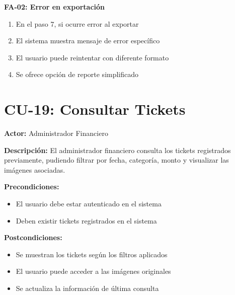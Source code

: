 \textbf{FA-02: Error en exportación}
\begin{enumerate}
    \item En el paso 7, si ocurre error al exportar
    \item El sistema muestra mensaje de error específico
    \item El usuario puede reintentar con diferente formato
    \item Se ofrece opción de reporte simplificado
\end{enumerate}

\section{CU-19: Consultar Tickets}

\noindent\textbf{Actor:} Administrador Financiero

\noindent\textbf{Descripción:} El administrador financiero consulta los tickets registrados previamente, pudiendo filtrar por fecha, categoría, monto y visualizar las imágenes asociadas.

\noindent\textbf{Precondiciones:}
\begin{itemize}
    \item El usuario debe estar autenticado en el sistema
    \item Deben existir tickets registrados en el sistema
\end{itemize}

\noindent\textbf{Postcondiciones:}
\begin{itemize}
    \item Se muestran los tickets según los filtros aplicados
    \item El usuario puede acceder a las imágenes originales
    \item Se actualiza la información de última consulta
\end{itemize}

